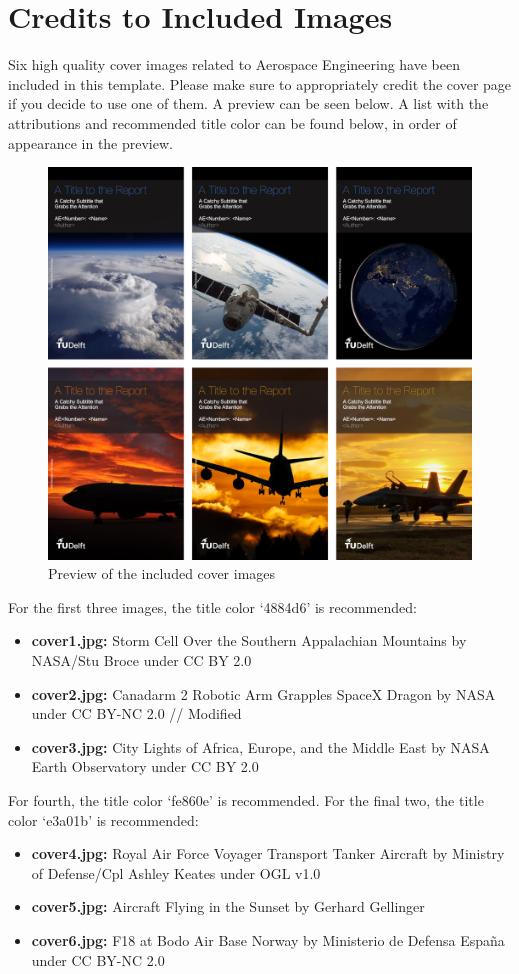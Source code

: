 \newpage
\section{Credits to Included Images}

Six high quality cover images related to Aerospace Engineering have been included in this template. Please make sure to appropriately credit the cover page if you decide to use one of them. A preview can be seen below. A list with the attributions and recommended title color can be found below, in order of appearance in the preview.

\begin{figure}[h]
    \centering
    \includegraphics[width=0.75\linewidth]{figures/covers.jpg}
    \caption{Preview of the included cover images}
\end{figure}

\noindent For the first three images, the title color `4884d6' is recommended:

\begin{itemize}
    \item \textbf{cover1.jpg:} Storm Cell Over the Southern Appalachian Mountains by NASA/Stu Broce under CC BY 2.0
    \item \textbf{cover2.jpg:} Canadarm 2 Robotic Arm Grapples SpaceX Dragon by NASA under CC BY-NC 2.0 // Modified
    \item \textbf{cover3.jpg:} City Lights of Africa, Europe, and the Middle East by NASA Earth Observatory under CC BY 2.0
\end{itemize}

\noindent For fourth, the title color `fe860e' is recommended. For the final two, the title color `e3a01b' is recommended:

\begin{itemize}
    \item \textbf{cover4.jpg:} Royal Air Force Voyager Transport Tanker Aircraft by Ministry of Defense/Cpl Ashley Keates under OGL v1.0
    \item \textbf{cover5.jpg:} Aircraft Flying in the Sunset by Gerhard Gellinger
    \item \textbf{cover6.jpg:} F18 at Bodo Air Base Norway by Ministerio de Defensa España under CC BY-NC 2.0
\end{itemize}
